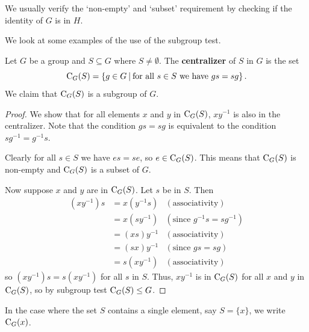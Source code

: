 \begin{remark}
We usually verify the `non-empty' and `subset' requirement by checking if the identity of $G$ is in $H$.
\end{remark}

We look at some examples of the use of the subgroup test.
\begin{example}\label{example-centralizer-of-a-subset}
    Let $G$ be a group and $S \subseteq G$ where $S \neq \emptyset$. The \textbf{centralizer} of $S$ in $G$ is the set
    \[
        \C{G}{S} = \left\{g \in G \vert \text{for all } s \in S \text{ we have } gs = sg\right\}.
    \]
    We claim that $\mathrm{C}_{G}(S)$ is a subgroup of $G$.
    \begin{proof}
        We show that for all elements $x$ and $y$ in $\mathrm{C}_{G}(S)$, $xy^{-1}$ is also in the centralizer. Note that the condition $gs = sg$ is equivalent to the condition $sg^{-1} = g^{-1}s$.

        Clearly for all $s \in S$ we have $es = se$, so $e \in \mathrm{C}_{G}(S)$. This means that $\mathrm{C}_{G}(S)$ is non-empty and $\mathrm{C}_{G}(S)$ is a subset of $G$.
        
        Now suppose $x$ and $y$ are in $\mathrm{C}_{G}(S)$. Let $s$ be in $S$. Then
        \begin{align*}
            (xy^{-1})s &= x(y^{-1}s) & (\text{associativity})\\
            &= x(sy^{-1}) & (\text{since } g^{-1}s = sg^{-1})\\
            &= (xs)y^{-1} & (\text{associativity})\\
            &= (sx)y^{-1} & (\text{since } gs = sg)\\
            &= s(xy^{-1}) & (\text{associativity})
        \end{align*}
        so $(xy^{-1})s = s(xy^{-1})$ for all $s$ in $S$. Thus, $xy^{-1}$ is in $\mathrm{C}_{G}(S)$ for all $x$ and $y$ in $\mathrm{C}_{G}(S)$, so by subgroup test $\mathrm{C}_{G}(S) \leq G$.
    \end{proof}
\end{example}
\begin{remark}
    In the case where the set $S$ contains a single element, say $S = \{x\}$, we write $\mathrm{C}_{G}(x)$.
\end{remark}

